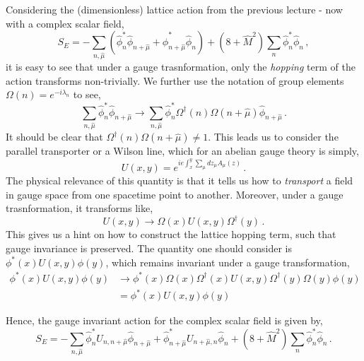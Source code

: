 \documentclass[11pt]{article}
\theoremstyle{definition}
\begin{document}
Considering the (dimensionless) lattice action from the previous lecture - now with a complex scalar field,
\begin{equation}\label{eqn:latt_action}
 S_E = - \displaystyle\sum_{n,\hat{\mu}} \left( \hat{\phi}^*_n \hat{\phi}_{n+\hat{\mu}} + \hat{\phi}^*_{n+\hat{\mu}} \hat{\phi}_n \right) + \left(8 + \hat{M}^2\right) \displaystyle\sum_n \hat{\phi}^*_n \hat{\phi}_n \,,
\end{equation}
it is easy to see that under a gauge trasnformation, only the \textit{hopping} term of the action transforms non-trivially. We further use the notation of group elements $\Omega(n) = e^{-i \lambda_n}$ to see,
\begin{equation}
    \displaystyle\sum_{n,\hat{\mu}} \hat{\phi}^*_n \hat{\phi}_{n+\hat{\mu}} \to \displaystyle\sum_{n,\hat{\mu}} \hat{\phi}^*_n \Omega^{\dagger}(n) \Omega(n+\hat{\mu}) \hat{\phi}_{n+\hat{\mu}}\,.
\end{equation}
It should be clear that $\Omega^{\dagger}(n) \Omega(n+\hat{\mu}) \neq 1$. This leads us to consider the parallel transporter or a Wilson line, which for an abelian gauge theory is simply,
\begin{equation}\label{eqn:wilson_line}
    U(x,y) = e^{i e \int^y_x \sum_{\mu} dz_{\mu} A_\mu(z)}\,.
\end{equation} 
The physical relevance of this quantity is that it tells us how to \textit{transport} a field in gauge space from one spacetime point to another. Moreover, under a gauge trasnformation, it transforms like,
\begin{equation}\label{eqn:wilson_line_GT}
    U(x,y) \to \Omega(x) U(x,y) \Omega^{\dagger}(y) \,.
\end{equation}
This gives us a hint on how to construct the lattice hopping term, such that gauge invariance is preserved. The quantity one should consider is $\phi^*(x) U(x,y) \phi(y)$, which remains invariant under a gauge transformation,
\begin{align}\label{eqn:invar_GT}
    \phi^*(x) U(x,y) \phi(y) &\to \phi^*(x) \Omega(x) \Omega^{\dagger}(x) U(x,y) \Omega^{\dagger}(y) \Omega(y) \phi(y) \nonumber \\
    &= \phi^*(x) U(x,y) \phi(y)
\end{align}

Hence, the gauge invariant action for the complex scalar field is given by,
\begin{equation}
    S_E = - \displaystyle\sum_{n,\hat{\mu}} \hat{\phi}^*_n U_{n, n+\hat{\mu}}\hat{\phi}_{n+\hat{\mu}} + \hat{\phi}^*_{n+\hat{\mu}} U_{n+\hat{\mu},n} \hat{\phi}_n + \left(8 + \hat{M}^2\right) \displaystyle\sum_n \hat{\phi}^*_n \hat{\phi}_n \,.
\end{equation}
\end{document}
